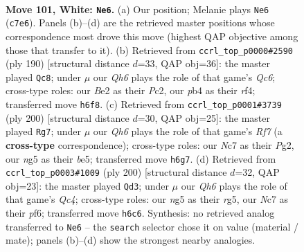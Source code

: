 \documentclass[11pt]{article}
\begin{document}
\clearpage

\begin{figure}[p]\centering
\begin{subfigure}{0.46\textwidth}\centering
\resizebox{\linewidth}{!}{%
\newchessgame
\chessboard[
  setfen={8/2N4b/7Q/5kn1/1p6/4K3/4B3/8 w - - 2 101},
  showmover=false,
  pgfstyle=straightmove, color=movearrow, markmove={c7-e6}
]}
\caption{}
\end{subfigure}\hfill
\begin{subfigure}{0.46\textwidth}\centering
\resizebox{\linewidth}{!}{%
\newchessgame
\chessboard[
  setfen={8/4k3/2Qb4/2p5/5r2/8/2PK4/8 w - - 17 96},
  showmover=false,
  pgfstyle=straightmove, color=movearrow, markmove={c6-c8}
]}
\caption{}
\end{subfigure}
\\[4pt]
\begin{subfigure}{0.46\textwidth}\centering
\resizebox{\linewidth}{!}{%
\newchessgame
\chessboard[
  setfen={8/5R2/5n2/4b2k/7p/5K2/2B3P1/8 w - - 56 101},
  showmover=false,
  pgfstyle=straightmove, color=movearrow, markmove={f7-g7}
]}
\caption{}
\end{subfigure}\hfill
\begin{subfigure}{0.46\textwidth}\centering
\resizebox{\linewidth}{!}{%
\newchessgame
\chessboard[
  setfen={8/4k3/5p2/2b3r1/2Q5/8/8/7K w - - 5 101},
  showmover=false,
  pgfstyle=straightmove, color=movearrow, markmove={c4-d3}
]}
\caption{}
\end{subfigure}
\caption{\textbf{Move 101, White: \texttt{Ne6}.} (a) Our position; Melanie plays \texttt{Ne6} (\texttt{c7e6}). Panels (b)--(d) are the retrieved master positions whose correspondence most drove this move (highest QAP objective among those that transfer to it). (b) Retrieved from \texttt{ccrl\_top\_p0000\#2590} (ply 190) [structural distance $d$=33, QAP obj=36]: the master played \texttt{Qc8}; under $\mu$ our \emph{Qh6} plays the role of that game's \emph{Qc6}; cross-type roles: our \emph{B}e2 as their \emph{P}c2, our \emph{p}b4 as their \emph{r}f4; transferred move \texttt{h6f8}. (c) Retrieved from \texttt{ccrl\_top\_p0001\#3739} (ply 200) [structural distance $d$=30, QAP obj=25]: the master played \texttt{Rg7}; under $\mu$ our \emph{Qh6} plays the role of that game's \emph{Rf7} (a \textbf{cross-type} correspondence); cross-type roles: our \emph{N}c7 as their \emph{P}g2, our \emph{n}g5 as their \emph{b}e5; transferred move \texttt{h6g7}. (d) Retrieved from \texttt{ccrl\_top\_p0003\#1009} (ply 200) [structural distance $d$=32, QAP obj=23]: the master played \texttt{Qd3}; under $\mu$ our \emph{Qh6} plays the role of that game's \emph{Qc4}; cross-type roles: our \emph{n}g5 as their \emph{r}g5, our \emph{N}c7 as their \emph{p}f6; transferred move \texttt{h6c6}. Synthesis: no retrieved analog transferred to \texttt{Ne6} -- the \texttt{search} selector chose it on value (material / mate); panels (b)--(d) show the strongest nearby analogies.}
\label{fig:thought-m200}
\end{figure}
\end{document}
